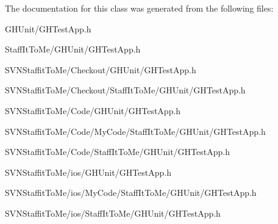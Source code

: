 \-The documentation for this class was generated from the following files\-:\begin{DoxyCompactItemize}
\item 
\-G\-H\-Unit/\-G\-H\-Test\-App.\-h\item 
\-Staff\-It\-To\-Me/\-G\-H\-Unit/\-G\-H\-Test\-App.\-h\item 
\-S\-V\-N\-Staffit\-To\-Me/\-Checkout/\-G\-H\-Unit/\-G\-H\-Test\-App.\-h\item 
\-S\-V\-N\-Staffit\-To\-Me/\-Checkout/\-Staff\-It\-To\-Me/\-G\-H\-Unit/\-G\-H\-Test\-App.\-h\item 
\-S\-V\-N\-Staffit\-To\-Me/\-Code/\-G\-H\-Unit/\-G\-H\-Test\-App.\-h\item 
\-S\-V\-N\-Staffit\-To\-Me/\-Code/\-My\-Code/\-Staff\-It\-To\-Me/\-G\-H\-Unit/\-G\-H\-Test\-App.\-h\item 
\-S\-V\-N\-Staffit\-To\-Me/\-Code/\-Staff\-It\-To\-Me/\-G\-H\-Unit/\-G\-H\-Test\-App.\-h\item 
\-S\-V\-N\-Staffit\-To\-Me/ios/\-G\-H\-Unit/\-G\-H\-Test\-App.\-h\item 
\-S\-V\-N\-Staffit\-To\-Me/ios/\-My\-Code/\-Staff\-It\-To\-Me/\-G\-H\-Unit/\-G\-H\-Test\-App.\-h\item 
\-S\-V\-N\-Staffit\-To\-Me/ios/\-Staff\-It\-To\-Me/\-G\-H\-Unit/\-G\-H\-Test\-App.\-h\end{DoxyCompactItemize}
